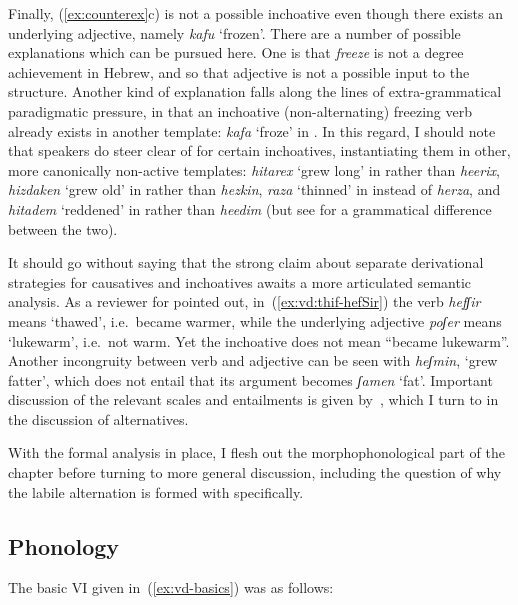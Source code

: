 \begin{exe}
\begin{xlist}
\begin{xlist}
\begin{exe}
\begin{exe}
\begin{xlist}
\begin{exe}
\begin{xlist}
\begin{exe}
\begin{xlist}
\begin{xlist}
\begin{exe}
\begin{xlist}
\begin{exe}
\begin{xlist}
\begin{exe}
\begin{exe}
\begin{exe}
\begin{xlist}
\begin{exe}
\begin{exe}
\begin{xlist}
\begin{xlist}
\begin{exe}
\begin{xlist}
\begin{exe}
\begin{exe}
\begin{exe}
\begin{xlist}
Finally, (\ref{ex:counterex}c) is not a possible inchoative even though there exists an underlying adjective, namely \emph{kafu} `frozen'. There are a number of possible explanations which can be pursued here. One is that \emph{freeze} is not a degree achievement in Hebrew, and so that adjective is not a possible input to the structure. Another kind of explanation falls along the lines of extra-grammatical paradigmatic pressure, in that an inchoative (non-alternating) freezing verb already exists in another template: \emph{kafa} `froze' in {\tkal}. In this regard, I should note that speakers do steer clear of {\thif} for certain inchoatives, instantiating them in other, more canonically non-active templates: \emph{hitarex} `grew long' in {\thit} rather than \emph{heerix}, \emph{hizdaken} `grew old' in {\thit} rather than \emph{hezkin}, \emph{raza} `thinned' in {\tkal} instead of \emph{herza}, and \emph{hitadem} `reddened' in {\thit} rather than \emph{heedim} (but see \citealt[22]{doron03} for a grammatical difference between the two).

It should go without saying that the strong claim about separate derivational strategies for causatives and inchoatives awaits a more articulated semantic analysis. As a reviewer for \cite{kastner19tlr} pointed out, in~(\ref{ex:vd:thif-hefSir}) the verb \emph{hefʃir} means `thawed', i.e.~became warmer, while the underlying adjective \emph{poʃer} means `lukewarm', i.e.~not warm. Yet the inchoative does not mean ``became lukewarm''. Another incongruity between verb and adjective can be seen with \emph{heʃmin}, `grew fatter', which does not entail that its argument becomes \emph{ʃamen} `fat'. Important discussion of the relevant scales and entailments is given by~\cite{borer91}, which I turn to in the discussion of alternatives.

With the formal analysis in place, I flesh out the morphophonological part of the chapter before turning to more general discussion, including the question of why the labile alternation is formed with {\vd} specifically.

	
	\subsection{Phonology} \label{vd:vd:phono}
The basic VI given in~(\ref{ex:vd-basics}) was as follows:
 \begin{exe}
\ex  {\vd} {\lra} {\thif} 
 \z 


\end{exe}
\end{xlist}
\end{exe}
\end{exe}
\end{exe}
\end{xlist}
\end{exe}
\end{xlist}
\end{xlist}
\end{exe}
\end{exe}
\end{xlist}
\end{exe}
\end{exe}
\end{exe}
\end{xlist}
\end{exe}
\end{xlist}
\end{exe}
\end{xlist}
\end{xlist}
\end{exe}
\end{xlist}
\end{exe}
\end{xlist}
\end{exe}
\end{exe}
\end{xlist}
\end{xlist}
\end{exe}
